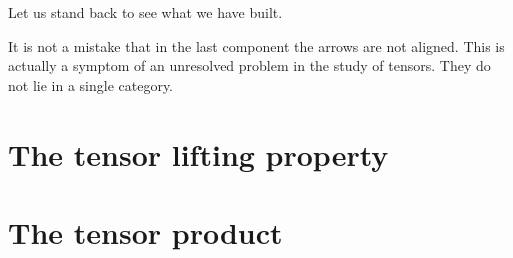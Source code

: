 Let us stand back to see what we have built.

\begin{center}
\end{center}
It is not a mistake that in the last component the arrows are not aligned.
This is actually a symptom of an unresolved problem in the study of tensors.
They do not lie in a single category.  


\section{The tensor lifting property}



\section{The tensor product}